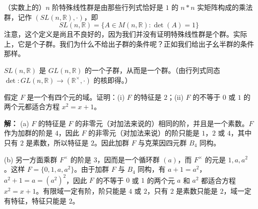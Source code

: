 \begin{definition}[$n$ 阶特殊线性群行列式是 1（定义 1.12）]
（实数上的）$n$ 阶特殊线性群是由那些行列式恰好是 $1$ 的 $n*n$ 实矩阵构成的乘法群，记作 $(SL(n,\mathbb{R}),\cdot)$，即
\[
SL(n,\mathbb{R})=\{A\in M(n,\mathbb{R}):\det(A)=1\}
\]
注意，这个定义是尚且不良好的，因为我们并没有证明特殊线性群是个群。实际上，它是个子群。我们为什么不给出子群的条件呢？正如我们给出子幺半群的条件那样。
\end{definition}

\begin{proposition}[命题 1.12：特殊线性群是群]
$SL(n,\mathbb{R})$ 是 $GL(n,\mathbb{R})$ 的一个子群，从而是一个群。（由行列式同态 $\det:GL(n,\mathbb{R})\to(\mathbb{R}^\times,\cdot)$ 的核即得。）
\end{proposition}

\begin{example}[4 元群]
假定 $F$ 是一个有四个元的域。证明：(i) $F$ 的特征是 $2$；(ii) $F$ 的不等于 $0$ 或 $1$ 的两个元都适合方程 $x^2=x+1$。

\textbf{解：} (a) $F$ 的特征是 $F$ 的非零元（对加法来说的）相同的阶，并且是一个素数。$F$ 作为加群的阶是 $4$，因此 $F$ 的非零元（对加法来说）的阶只能是 $1$，$2$ 或 $4$，其中只有 $2$ 是素数，所以特征是 $2$。因此加群 $F$ 与克莱因四元群 $B_4$ 同构。

(b) 另一方面乘群 $F^\times$ 的阶是 $3$，因而是一个循环群 $(a)$，而 $F^\times$ 的元是 $1,a,a^2$。这样 $F=\{0,1,a,a^2\}$。由于加群 $F$ 与 $B_4$ 同构，有 $a+1=a^2$，$a^2+1=a=(a^2)^2$，因此 $F$ 的不等于 $0$ 或 $1$ 的两个元 $a$ 和 $a^2$ 都适合方程 $x^2=x+1$。有限域一定有阶，阶只能是 $4$ 或 $2$，只有 $2$ 是素数只能是 $2$，域一定有特征，特征只能是 $2$。
\end{example}
